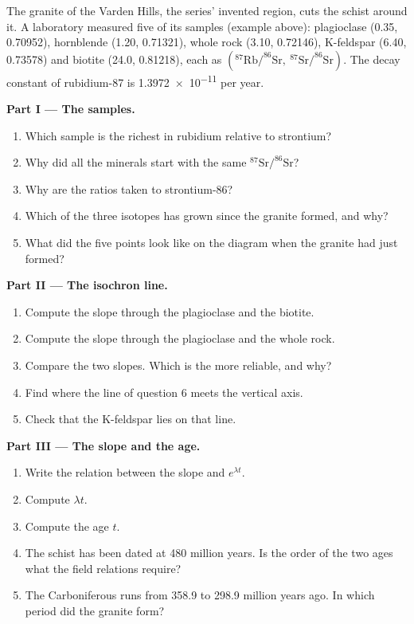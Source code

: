 \begin{problem}
\label{pb:g12:age-of-the-earth:1}
The granite of the Varden Hills, the series' invented region, cuts the
schist around it. A laboratory measured five of its samples (example above):
plagioclase (0.35, 0.70952), hornblende (1.20, 0.71321), whole rock (3.10,
0.72146), K-feldspar (6.40, 0.73578) and biotite (24.0, 0.81218), each as
$(^{87}\mathrm{Rb}/^{86}\mathrm{Sr},\ ^{87}\mathrm{Sr}/^{86}\mathrm{Sr})$. The
decay constant of rubidium-87 is \num{1.3972e-11} per year.

\medskip
\noindent\textbf{Part I --- The samples.}
\begin{enumerate}
  \item Which sample is the richest in rubidium relative to strontium?
  \item Why did all the minerals start with the same
        $^{87}\mathrm{Sr}/^{86}\mathrm{Sr}$?
  \item Why are the ratios taken to strontium-86?
  \item Which of the three isotopes has grown since the granite formed, and
        why?
  \item What did the five points look like on the diagram when the granite
        had just formed?
\end{enumerate}

\medskip
\noindent\textbf{Part II --- The isochron line.}
\begin{enumerate}[resume]
  \item Compute the slope through the plagioclase and the biotite.
  \item Compute the slope through the plagioclase and the whole rock.
  \item Compare the two slopes. Which is the more reliable, and why?
  \item Find where the line of question 6 meets the vertical axis.
  \item Check that the K-feldspar lies on that line.
\end{enumerate}

\medskip
\noindent\textbf{Part III --- The slope and the age.}
\begin{enumerate}[resume]
  \item Write the relation between the slope and $e^{\lambda t}$.
  \item Compute $\lambda t$.
  \item Compute the age $t$.
  \item The schist has been dated at 480 million years. Is the order of the
        two ages what the field relations require?
  \item The Carboniferous runs from 358.9 to 298.9 million years ago. In
        which period did the granite form?
\end{enumerate}


\end{problem}
